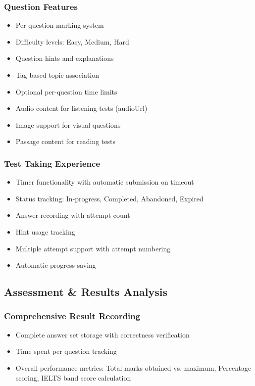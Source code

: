 \documentclass{article}
\begin{document}
\subsubsection{Question Features}
\begin{itemize}
    \item Per-question marking system
    \item Difficulty levels: Easy, Medium, Hard
    \item Question hints and explanations
    \item Tag-based topic association
    \item Optional per-question time limits
    \item Audio content for listening tests (audioUrl)
    \item Image support for visual questions
    \item Passage content for reading tests
\end{itemize}

\subsubsection{Test Taking Experience}
\begin{itemize}
    \item Timer functionality with automatic submission on timeout
    \item Status tracking: In-progress, Completed, Abandoned, Expired
    \item Answer recording with attempt count
    \item Hint usage tracking
    \item Multiple attempt support with attempt numbering
    \item Automatic progress saving
\end{itemize}

\subsection{Assessment \& Results Analysis}

\subsubsection{Comprehensive Result Recording}
\begin{itemize}
    \item Complete answer set storage with correctness verification
    \item Time spent per question tracking
    \item Overall performance metrics: Total marks obtained vs. maximum, Percentage scoring, IELTS band score calculation
\end{itemize}
\end{document}
